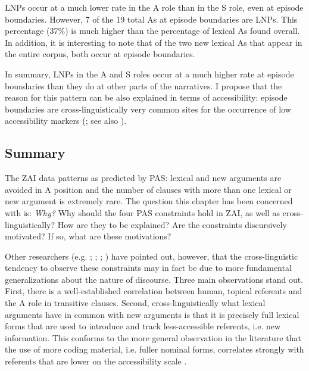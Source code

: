 LNPs occur at a much lower rate in the A role than in the S role, even at episode boundaries. However, 7 of the 19 total As at episode boundaries are LNPs. This percentage (37{\%}) is much higher than the percentage of lexical As found overall. In addition, it is interesting to note that of the two new lexical As that appear in the entire corpus, both occur at episode boundaries. 

In summary, LNPs in the A and S roles occur at a much higher rate at episode boundaries than they do at other parts of the narratives. I propose that the reason for this pattern can be also explained in terms of accessibility: episode boundaries are cross-linguistically very common sites for the occurrence of low accessibility markers (\citealt[52]{ariel2001}; see also \citealt{downing1980}).


\subsection{Summary}\label{discussion}

The ZAI data patterns as predicted by PAS: lexical and new arguments are avoided in A position and the number of clauses with more than one lexical or new argument is extremely rare. The question this chapter has been concerned with is: \textit{Why?} Why should the four PAS constraints hold in ZAI, as well as cross-linguistically? How are they to be explained? Are the constraints discursively motivated? If so, what are these motivations? 


Other researchers (e.g. \citealt{haspelmath2006}; \citealt{everett2009}; \citealt{haig2016}; \citealt{schnell2017}) have pointed out, however, that the cross-linguistic tendency to observe these constraints may in fact be due to more fundamental generalizations about the nature of discourse. Three main observations stand out. First, there is a well-established correlation between human, topical referents and the A role in transitive clauses. Second, cross-linguistically what lexical arguments have in common with new arguments is that it is precisely full lexical forms that are used to introduce and track less-accessible \citep{ariel1990} referents, i.e. new information. This conforms to the more general observation in the literature that the use of more coding material, i.e. fuller nominal forms, correlates strongly with referents that are lower on the accessibility scale \citep{givon1983}. 

